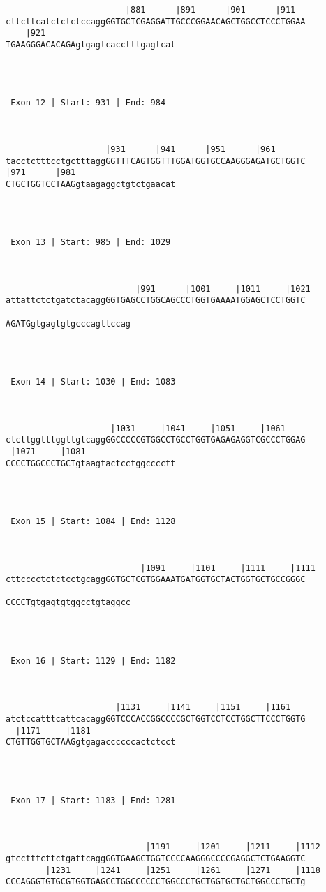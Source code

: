 \documentclass{article}
\begin{document}
\begin{Verbatim}
                        |881      |891      |901      |911  
cttcttcatctctctccaggGGTGCTCGAGGATTGCCCGGAACAGCTGGCCTCCCTGGAA
    |921                          
TGAAGGGACACAGAgtgagtcacctttgagtcat




 Exon 12 | Start: 931 | End: 984 



                    |931      |941      |951      |961      
tacctctttcctgctttaggGGTTTCAGTGGTTTGGATGGTGCCAAGGGAGATGCTGGTC
|971      |981                    
CTGCTGGTCCTAAGgtaagaggctgtctgaacat




 Exon 13 | Start: 985 | End: 1029 



                          |991      |1001     |1011     |1021
attattctctgatctacaggGGTGAGCCTGGCAGCCCTGGTGAAAATGGAGCTCCTGGTC
                         
AGATGgtgagtgtgcccagttccag




 Exon 14 | Start: 1030 | End: 1083 



                     |1031     |1041     |1051     |1061    
ctcttggtttggttgtcaggGGCCCCCGTGGCCTGCCTGGTGAGAGAGGTCGCCCTGGAG
 |1071     |1081                  
CCCCTGGCCCTGCTgtaagtactcctggcccctt




 Exon 15 | Start: 1084 | End: 1128 



                           |1091     |1101     |1111     |1111
cttcccctctctcctgcaggGGTGCTCGTGGAAATGATGGTGCTACTGGTGCTGCCGGGC
                         
CCCCTgtgagtgtggcctgtaggcc




 Exon 16 | Start: 1129 | End: 1182 



                      |1131     |1141     |1151     |1161   
atctccatttcattcacaggGGTCCCACCGGCCCCGCTGGTCCTCCTGGCTTCCCTGGTG
  |1171     |1181                 
CTGTTGGTGCTAAGgtgagaccccccactctcct




 Exon 17 | Start: 1183 | End: 1281 



                            |1191     |1201     |1211     |1112
gtcctttcttctgattcaggGGTGAAGCTGGTCCCCAAGGGCCCCGAGGCTCTGAAGGTC
        |1231     |1241     |1251     |1261     |1271     |1118
CCCAGGGTGTGCGTGGTGAGCCTGGCCCCCCTGGCCCTGCTGGTGCTGCTGGCCCTGCTg
                   

\end{Verbatim}
\end{document}
